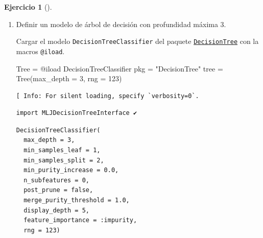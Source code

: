 \documentclass[
  a4paper,
]{scrreport}
\newenvironment{Shaded}{\begin{snugshade}}{\end{snugshade}}
\newcommand{\FloatTok}[1]{\textcolor[rgb]{0.68,0.00,0.00}{#1}}
\newcommand{\FunctionTok}[1]{\textcolor[rgb]{0.28,0.35,0.67}{#1}}
\newcommand{\NormalTok}[1]{\textcolor[rgb]{0.00,0.23,0.31}{#1}}
\newcommand{\OperatorTok}[1]{\textcolor[rgb]{0.37,0.37,0.37}{#1}}
\newcommand{\PreprocessorTok}[1]{\textcolor[rgb]{0.68,0.00,0.00}{#1}}
\newcommand{\StringTok}[1]{\textcolor[rgb]{0.13,0.47,0.30}{#1}}
\theoremstyle{definition}
\newtheorem{exercise}{Ejercicio}[chapter]
\theoremstyle{remark}
\begin{document}
\begin{exercise}[]
\begin{enumerate}
\begin{tcolorbox}
  \end{tcolorbox}
\item
  Definir un modelo de árbol de decisión con profundidad máxima 3.

  \begin{tcolorbox}[enhanced jigsaw, toptitle=1mm, colframe=quarto-callout-note-color-frame, titlerule=0mm, left=2mm, arc=.35mm, colbacktitle=quarto-callout-note-color!10!white, opacityback=0, bottomtitle=1mm, toprule=.15mm, coltitle=black, breakable, colback=white, rightrule=.15mm, opacitybacktitle=0.6, leftrule=.75mm, bottomrule=.15mm, title=\textcolor{quarto-callout-note-color}{\faInfo}\hspace{0.5em}{Ayuda}]

  Cargar el modelo \texttt{DecisionTreeClassifier} del paquete
  \href{https://docs.juliahub.com/DecisionTree/}{\texttt{DecisionTree}}
  con la macros \texttt{@iload}.

  \end{tcolorbox}

  \begin{tcolorbox}[enhanced jigsaw, toptitle=1mm, colframe=quarto-callout-tip-color-frame, titlerule=0mm, left=2mm, arc=.35mm, colbacktitle=quarto-callout-tip-color!10!white, opacityback=0, bottomtitle=1mm, toprule=.15mm, coltitle=black, breakable, colback=white, rightrule=.15mm, opacitybacktitle=0.6, leftrule=.75mm, bottomrule=.15mm, title=\textcolor{quarto-callout-tip-color}{\faLightbulb}\hspace{0.5em}{Solución}]

\begin{Shaded}
\begin{Highlighting}[]
\NormalTok{Tree }\OperatorTok{=} \PreprocessorTok{@iload}\NormalTok{ DecisionTreeClassifier pkg }\OperatorTok{=} \StringTok{"DecisionTree"}
\NormalTok{tree }\OperatorTok{=} \FunctionTok{Tree}\NormalTok{(max\_depth }\OperatorTok{=} \FloatTok{3}\NormalTok{, rng }\OperatorTok{=} \FloatTok{123}\NormalTok{)}
\end{Highlighting}
\end{Shaded}

\begin{verbatim}
[ Info: For silent loading, specify `verbosity=0`. 
\end{verbatim}

\begin{verbatim}
import MLJDecisionTreeInterface ✔
\end{verbatim}

\begin{verbatim}
DecisionTreeClassifier(
  max_depth = 3, 
  min_samples_leaf = 1, 
  min_samples_split = 2, 
  min_purity_increase = 0.0, 
  n_subfeatures = 0, 
  post_prune = false, 
  merge_purity_threshold = 1.0, 
  display_depth = 5, 
  feature_importance = :impurity, 
  rng = 123)
\end{verbatim}


\end{tcolorbox}
\end{enumerate}
\end{exercise}
\end{document}
